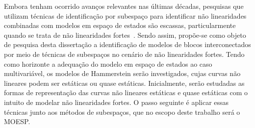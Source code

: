 Embora tenham ocorrido avanços relevantes nas últimas décadas, pesquisas que utilizam técnicas de identificação por subespaço para identificar não linearidades combinadas com modelos em espaço de estados são escassas, particularmente quando se trata de não linearidades fortes~\citep{aissaoui2016,noel2017}. Sendo assim, propõe-se como objeto de pesquisa desta dissertação a identificação de modelos de blocos interconectados por meio de técnicas de subespaços no cenário de não linearidades fortes. Tendo como horizonte a adequação do modelo em espaço de estados ao caso multivariável, os modelos de Hammerstein serão investigados, cujas curvas não lineares podem ser estáticas ou quase estáticas. Inicialmente, serão estudadas as formas de representação das curvas não lineares estáticas e quase estáticas com o intuito de modelar não linearidades fortes. O passo seguinte é aplicar essas técnicas junto aos métodos de subespaços, que no escopo deste trabalho será o \acs{MOESP}.




